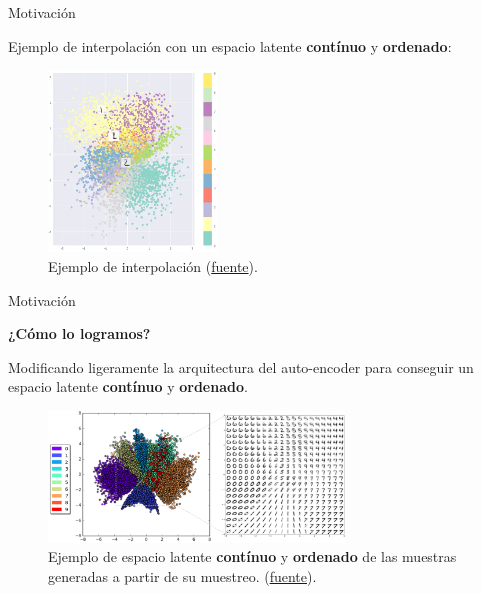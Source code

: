 \begin{frame}{Motivación}

Ejemplo de interpolación con un espacio latente \textbf{contínuo} y \textbf{ordenado}:

\begin{figure}
    \centering
    \includegraphics[width=0.4\textwidth]{Slides/figures/02_Metodos_Generativos/vae-interpolation.png}
    \caption{Ejemplo de interpolación (\href{https://towardsdatascience.com/intuitively-understanding-variational-autoencoders-1bfe67eb5daf}{fuente}).}
    \label{fig:enter-label}
\end{figure}

\end{frame}


\begin{frame}{Motivación}

\textbf{¿Cómo lo logramos?}

Modificando ligeramente la arquitectura del auto-encoder para conseguir un espacio latente \textbf{contínuo} y \textbf{ordenado}.

\begin{figure}
    \centering
    \includegraphics[width=0.7\textwidth]{Slides/figures/02_Metodos_Generativos/vae-continuous-latent-space.png}
    \caption{Ejemplo de espacio latente \textbf{contínuo} y \textbf{ordenado} de las muestras generadas a partir de su muestreo. (\href{https://indico.ictp.it/event/8674/session/155/contribution/1121/material/slides/0.pdf}{fuente}).}
    \label{fig:enter-label}
\end{figure}

\end{frame}

